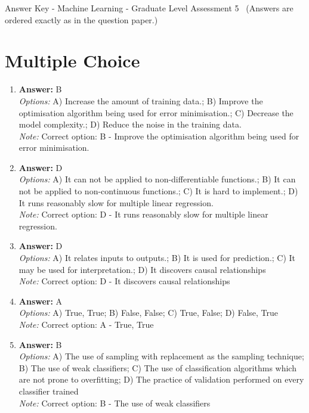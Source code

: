 \documentclass[12pt]{article}
\begin{document}
\begin{center}
Answer Key - Machine Learning - Graduate Level Assessment 5 \
\small (Answers are ordered exactly as in the question paper.)
\end{center}

\section*{Multiple Choice}
\begin{enumerate}[label=\arabic*.]
\item \textbf{Answer:} B
\\ \textit{Options:} A) Increase the amount of training data.; B) Improve the optimisation algorithm being used for error minimisation.; C) Decrease the model complexity.; D) Reduce the noise in the training data.
\\ \textit{Note:} Correct option: B - Improve the optimisation algorithm being used for error minimisation.
\item \textbf{Answer:} D
\\ \textit{Options:} A) It can not be applied to non-differentiable functions.; B) It can not be applied to non-continuous functions.; C) It is hard to implement.; D) It runs reasonably slow for multiple linear regression.
\\ \textit{Note:} Correct option: D - It runs reasonably slow for multiple linear regression.
\item \textbf{Answer:} D
\\ \textit{Options:} A) It relates inputs to outputs.; B) It is used for prediction.; C) It may be used for interpretation.; D) It discovers causal relationships
\\ \textit{Note:} Correct option: D - It discovers causal relationships
\item \textbf{Answer:} A
\\ \textit{Options:} A) True, True; B) False, False; C) True, False; D) False, True
\\ \textit{Note:} Correct option: A - True, True
\item \textbf{Answer:} B
\\ \textit{Options:} A) The use of sampling with replacement as the sampling technique; B) The use of weak classifiers; C) The use of classification algorithms which are not prone to overfitting; D) The practice of validation performed on every classifier trained
\\ \textit{Note:} Correct option: B - The use of weak classifiers
\end{enumerate}
\end{document}
